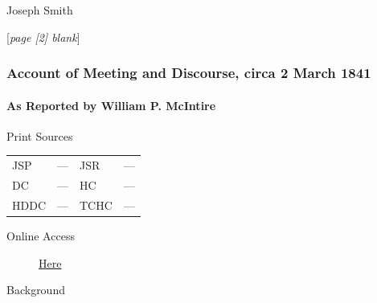 				\begin{tightright}
					Joseph Smith
				\end{tightright}

				[\textit{page [2] blank}]
				
		\subsubsection{Account of Meeting and Discourse, circa 2 March 1841}
			\label{EMS-1841-JS-CIR-2-MAR-1841}
			
			\paragraph{As Reported by William P. McIntire}
				\label{EMS-1841-JS-CIR-2-MAR-1841-WM}
			
				\begin{description}
					\item[Print Sources]
				\end{description}

				\begin{tabular}{p{0.5in}p{1in}p{0.5in}p{1in}}
					JSP	 	& ---		& JSR 		& --- \\
					DC	 	& ---		& HC 		& --- \\
					HDDC 	& ---		& TCHC 		& --- \\
				\end{tabular}
				
				\begin{description}
					\item[Online Access] \href{https://www.josephsmithpapers.org/paper-summary/account-of-meeting-and-discourse-circa-2march-1841/1}{Here}
				\end{description}
				
				\begin{description}
					\item[Background]
				\end{description}
				
				
